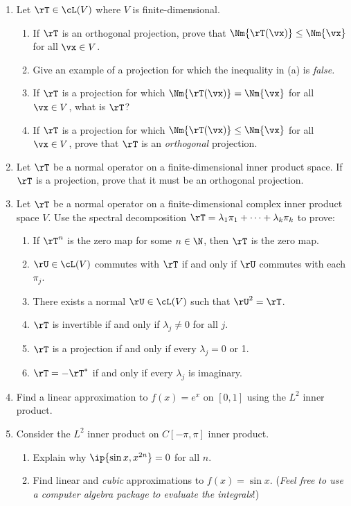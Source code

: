 \begin{exercises}
\begin{enumerate}
	\item Let $\rT\in\cL(V)$ where $V$ is finite-dimensional.
	\begin{enumerate}
	  \item If $\rT$ is an orthogonal projection, prove that $\Nm{\rT(\vx)}\le\Nm{\vx}$ for all $\vx\in V$.
	 	\item Give an example of a projection for which the inequality in (a) is \emph{false.}
	 	\item If $\rT$ is a projection for which $\Nm{\rT(\vx)}=\Nm{\vx}$ for all $\vx\in V$, what is $\rT$?
	 	\item If $\rT$ is a projection for which $\Nm{\rT(\vx)}\le\Nm{\vx}$ for all $\vx\in V$, prove that $\rT$ is an \emph{orthogonal} projection.
	\end{enumerate}
	
	\item Let $\rT$ be a normal operator on a finite-dimensional inner product space. If $\rT$ is a projection, prove that it must be an orthogonal projection.
	
	\item\label{exs:lastqn} Let $\rT$ be a normal operator on a finite-dimensional complex inner product space $V$. Use the spectral decomposition $\rT=\lambda_1\pi_1+\cdots+\lambda_k\pi_k$ to prove:
	\begin{enumerate}
	  \item If $\rT^n$ is the zero map for some $n\in\N$, then $\rT$ is the zero map.
	  \item $\rU\in\cL(V)$ commutes with $\rT$ if and only if $\rU$ commutes with each $\pi_j$.
	  \item There exists a normal $\rU\in\cL(V)$ such that $\rU^2=\rT$.
	  \item $\rT$ is invertible if and only if $\lambda_j\neq 0$ for all $j$.
	  \item $\rT$ is a projection if and only if every $\lambda_j=0$ or 1.
	  \item $\rT=-\rT^*$ if and only if every $\lambda_j$ is imaginary.
	\end{enumerate}
	
	\item Find a linear approximation to $f(x)=e^x$ on $[0,1]$ using the $L^2$ inner product.
	
	\item Consider the $L^2$ inner product on $C[-\pi,\pi]$ inner product.
	\begin{enumerate}
	  \item Explain why $\ip{\sin x,x^{2n}}=0$ for all $n$.
	  \item Find linear and \emph{cubic} approximations to $f(x)=\sin x$.\smallbreak
	  (\emph{Feel free to use a computer algebra package to evaluate the integrals}!)
	\end{enumerate}
	

\end{enumerate}
\end{exercises}

